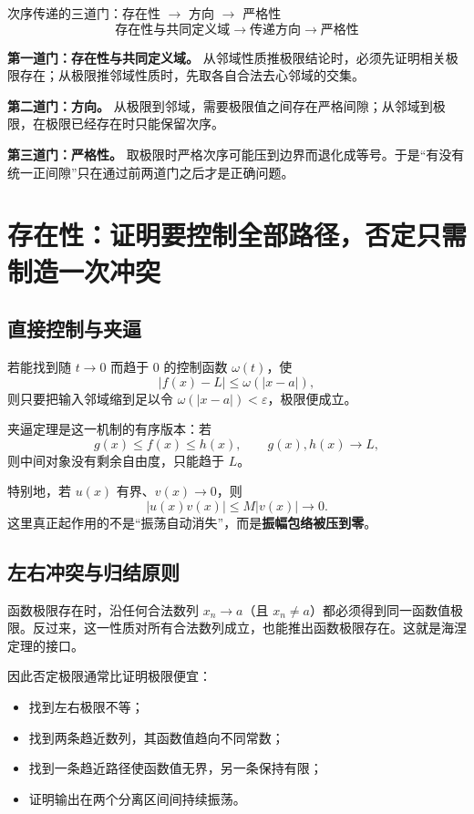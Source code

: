 \documentclass[11pt,a4paper]{ctexart}
\newcommand{\kw}[1]{\textbf{\color{deep}#1}}
\begin{document}
\begin{corebox}{次序传递的三道门：存在性 $\to$ 方向 $\to$ 严格性}
\[
\boxed{\text{存在性与共同定义域}\to\text{传递方向}\to\text{严格性}}
\]

\textbf{第一道门：存在性与共同定义域。} 从邻域性质推极限结论时，必须先证明相关极限存在；从极限推邻域性质时，先取各自合法去心邻域的交集。

\textbf{第二道门：方向。} 从极限到邻域，需要极限值之间存在严格间隙；从邻域到极限，在极限已经存在时只能保留次序。

\textbf{第三道门：严格性。} 取极限时严格次序可能压到边界而退化成等号。于是“有没有统一正间隙”只在通过前两道门之后才是正确问题。
\end{corebox}

\section{存在性：证明要控制全部路径，否定只需制造一次冲突}

\subsection{直接控制与夹逼}

若能找到随 $t\to0$ 而趋于 $0$ 的控制函数 $\omega(t)$，使
\[
\lvert f(x)-L\rvert\le \omega(\lvert x-a\rvert),
\]
则只要把输入邻域缩到足以令 $\omega(\lvert x-a\rvert)<\varepsilon$，极限便成立。

夹逼定理是这一机制的有序版本：若
\[
g(x)\le f(x)\le h(x),\qquad g(x),h(x)\to L,
\]
则中间对象没有剩余自由度，只能趋于 $L$。

特别地，若 $u(x)$ 有界、$v(x)\to0$，则
\[
\lvert u(x)v(x)\rvert\le M\lvert v(x)\rvert\to0.
\]
这里真正起作用的不是“振荡自动消失”，而是\kw{振幅包络被压到零}。

\subsection{左右冲突与归结原则}

函数极限存在时，沿任何合法数列 $x_n\to a$（且 $x_n\ne a$）都必须得到同一函数值极限。反过来，这一性质对所有合法数列成立，也能推出函数极限存在。这就是海涅定理的接口。

因此否定极限通常比证明极限便宜：
\begin{itemize}
  \item 找到左右极限不等；
  \item 找到两条趋近数列，其函数值趋向不同常数；
  \item 找到一条趋近路径使函数值无界，另一条保持有限；
  \item 证明输出在两个分离区间间持续振荡。
\end{itemize}
\end{document}
